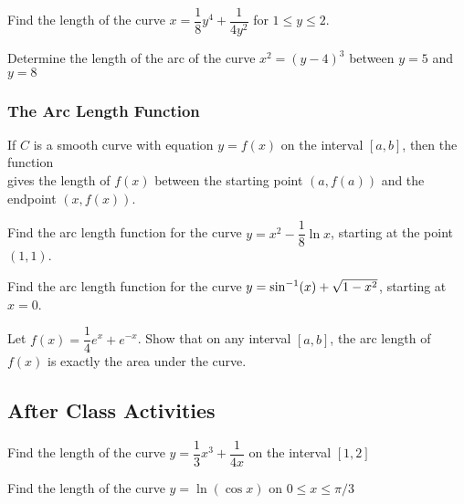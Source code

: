 \documentclass[notes]{subfiles}
\begin{document}
		\begin{ex}
			Find the length of the curve $x = \dfrac{1}{8}y^4 + \dfrac{1}{4y^2}$ for $1\leq y \leq 2$.
		\end{ex}
			\newpage
			
		\begin{ex}
			Determine the length of the arc of the curve $x^2 = (y-4)^3$ between $y = 5$ and $y = 8$
		\end{ex}
		
	\subsubsection*{The Arc Length Function}
		\begin{defn}
			If $C$ is a smooth curve with equation $y = f(x)$ on the interval $[a,b]$, then the function \\[50pt]
			
			gives the length of $f(x)$ between the starting point $(a,f(a))$ and the endpoint $(x,f(x))$.
		\end{defn}
		
		\begin{ex}
			Find the arc length function for the curve $y = x^2 - \dfrac{1}{8}\ln x$, starting at the point $(1,1)$.
		\end{ex}
			\newpage
			
		\begin{ex}
			Find the arc length function for the curve $y = \sin^{-1}(x) + \sqrt{1-x^2}$, starting at $x = 0$.
		\end{ex}
			
		\begin{ex}
			Let $f(x) = \dfrac{1}{4}e^x + e^{-x}$.  Show that on any interval $[a,b]$, the arc length of $f(x)$ is exactly the area under the curve.
		\end{ex}
			\newpage
			
	\subsection*{After Class Activities}
		\begin{ex}
			Find the length of the curve $y = \dfrac{1}{3}x^3 + \dfrac{1}{4x}$ on the interval $[1,2]$
		\end{ex}
			
		\begin{ex}
			Find the length of the curve $y = \ln(\cos x)$ on $0\leq x\leq \pi/3$
		\end{ex}
			\newpage
			
\end{document}
